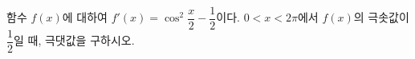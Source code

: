 함수 $f(x)$에 대하여 $f'(x)=\cos^2\dfrac{x}{2}-\dfrac{1}{2}$이다. $0<x<2\pi$에서 $f(x)$의 극솟값이 $\dfrac{1}{2}$일 때, 극댓값을 구하시오.
